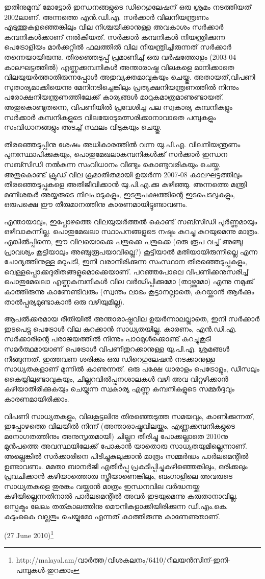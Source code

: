 ഇതിനുമുമ്പ് മോട്ടോര്‍ ഇന്ധനങ്ങളുടെ ഡിറെഗുലേഷന് ഒരു ശ്രമം നടത്തിയത് 2002ലാണ്. അന്നത്തെ 
എന്‍.ഡി.എ. സര്‍ക്കാര്‍ വിലനിയന്ത്രണം എടുത്തുകളഞ്ഞെങ്കിലും വില നിശ്ചയിക്കാനുള്ള അവകാശം സര്‍ക്കാര്‍ 
കമ്പനികള്‍ക്കാണ് നല്‍കിയത്. സര്‍ക്കാര്‍ കമ്പനികള്‍ നിയന്ത്രിക്കുന്ന പെട്രോളിയം മാര്‍ക്കറ്റില്‍ ഫലത്തില്‍ വില 
നിയന്ത്രിച്ചിരുന്നത് സര്‍ക്കാര്‍ തന്നെയായിരുന്നു. തിരഞ്ഞെടുപ്പ് പ്രമാണിച്ച് ഒരു വര്‍ഷത്തോളം (2003-04 
കാലഘട്ടത്തില്‍) എണ്ണക്കമ്പനികള്‍ അന്താരാഷ്ട്ര വിലകളെ മാനിക്കാതെ വിലയുയര്‍ത്താതിരുന്നപ്പോള്‍ 
അതുവ്യക്തമാവുകയും ചെയ്തു. അതായത്,വിപണി സുതാര്യമാക്കിയെന്നു മേനിനടിച്ചെങ്കിലും പ്രത്യക്ഷനിയന്ത്രണത്തില്‍ 
നിന്നും പരോക്ഷനിയന്ത്രണത്തിലേക്ക് കാര്യങ്ങള്‍ മാറുകമാത്രമാണുണ്ടായത്. അതുകൊണ്ടുതന്നെ, വിപണിയില്‍ 
പ്രവേശിച്ച പല സ്വകാര്യ കമ്പനികളും സര്‍ക്കാര്‍ കമ്പനികളുടെ വിലയോടുമത്സരിക്കാനാവാതെ പമ്പുകളും 
സംവിധാനങ്ങളും അടച്ച് സ്ഥലം വിടുകയും ചെയ്തു.

തിരഞ്ഞെടുപ്പിനു ശേഷം അധികാരത്തില്‍ വന്ന യു.പി.എ. വിലനിയന്ത്രണം പുനഃസ്ഥാപിക്കുകയും, 
പൊതുമേഖലാകമ്പനികള്‍ക്ക് സര്‍ക്കാര്‍ ഇന്ധന സബ്സിഡി നല്‍കുന്ന സംവിധാനം വീണ്ടും കൊണ്ടുവരികയും 
ചെയ്തു. അതുകൊണ്ട് ക്രൂഡ് വില ക്രമാതീതമായി ഉയര്‍ന്ന 2007-08 കാലഘട്ടത്തിലും തിരഞ്ഞെടുപ്പുകളെ 
അതിജീവിക്കാന്‍ യു.പി.എ.ക്കു കഴിഞ്ഞു. അന്നത്തെ മന്ത്രി മണിശങ്കര്‍ അയ്യരുടെ നിലപാടുകളും, ഇടതുപക്ഷത്തിന്റെ 
ഇടപെടലുകളും, ഒരുപക്ഷെ ഈ തീരുമാനത്തിനു കാരണമായിട്ടുണ്ടാവണം.

എന്തായാലും, ഇപ്പോഴത്തെ വിലയുയര്‍ത്തല്‍ കൊണ്ട് സബ്സിഡി പുര്‍ണ്ണമായും ഒഴിവാകുന്നില്ല. പൊതുമേഖലാ 
സ്ഥാപനങ്ങളുടെ നഷ്ടം കുറച്ചു കുറയുമെന്നു മാത്രം. എങ്കില്‍പ്പിന്നെ, ഈ വിലയൊക്കെ പതുക്കെ പതുക്കെ (ഒരു രൂപ 
വച്ച് അഞ്ചു പ്രാവശ്യം കൂട്ടിയാലും അഞ്ചുരൂപയാവില്ലെ?) കൂട്ടിയാല്‍ മതിയായിരുന്നില്ലെ എന്ന ചോദ്യത്തിനുള്ള മറുപടി, 
ഇനി വരാനിരിക്കുന്ന സംസ്ഥാന തിരഞ്ഞെടുപ്പുകളും, വെള്ളപ്പൊക്കദുരിതങ്ങളുമൊക്കെയാണ്. പറഞ്ഞപോലെ 
വിപണിക്കനുസരിച്ച് പൊതുമേഖലാ എണ്ണകമ്പനികള്‍ വില വര്‍ദ്ധിപ്പിക്കുമോ (താഴ്ത്തുമോ) എന്നു നമുക്ക് കാത്തിരുന്നു 
കാണേണ്ടിവരും (സ്വന്തം ലാഭം കൂട്ടാനല്ലാതെ, കുറയ്ക്കാന്‍ ആര്‍ക്കും താല്‍പ്പര്യമുണ്ടാകാന്‍ ഒരു വഴിയുമില്ല).

ആപല്‍ക്കരമായ രീതിയില്‍ അന്താരാഷ്ട്രവില ഉയര്‍ന്നാലല്ലാതെ, ഇനി സര്‍ക്കാര്‍ ഇടപെട്ടു പെട്രോള്‍ വില കുറക്കാന്‍
സാധ്യതയില്ല. കാരണം, എന്‍.ഡി.എ. സര്‍ക്കാരിന്റെ പരാജയത്തില്‍ നിന്നും പാഠമുള്‍ക്കൊണ്ട് കുറച്ചുകൂടി 
സമര്‍ത്ഥമായാണ് പെട്രോള്‍ വിപണിതുറക്കാനുള്ള യു.പി.എ. ശ്രമങ്ങള്‍ നീങ്ങുന്നത്. ഇത്തവണ ശരിക്കും ഒരു 
ഡിറെഗുലേഷന്‍ നടക്കാനുള്ള സാധ്യതകളാണ് മുന്നില്‍ കാണുന്നത്. ഒരു പക്ഷേ ധാരാളം പെട്രോളും, ഡീസലും 
കൈയ്യിലുണ്ടാവുകയും, ചില്ലറവില്‍പ്പനശാലകള്‍ വഴി അവ വിറ്റഴിക്കാന്‍ കഴിയാതിരിക്കുകയും ചെയ്യുന്ന സ്വകാര്യ 
എണ്ണ കമ്പനികളുടെ സമ്മര്‍ദ്ദവും കാരണമായിരിക്കാം.

വിപണി സാധ്യതകളും, വിലകൂട്ടലിനു തിരഞ്ഞെടുത്ത സമയവും, കാണിക്കുന്നത്, ഇപ്പോഴത്തെ വിലയില്‍ നിന്ന് 
(അന്താരാഷ്ട്രവിലയ്ക്കും, എണ്ണക്കമ്പനികളുടെ മനോഗതത്തിനും അനുസൃതമായി) ചില്ലറ തിരിച്ചു പോക്കല്ലാതെ 2010നു 
മുന്‍പത്തെ അവസ്ഥയിലേക്ക് പോകാന്‍ യാതൊരു സാധ്യതയുമില്ലെന്നാണ്. അല്ലെങ്കില്‍ സര്‍ക്കാരിനെ 
പിടിച്ചുകുലുക്കാന്‍ മാത്രം സമ്മര്‍ദ്ധം പാര്‍ലമെന്റില്‍ ഉണ്ടാവണം. മമതാ ബാനര്‍ജി എതിര്‍പ്പു പ്രകടിപ്പിച്ചുകഴിഞ്ഞെങ്കിലും,
ഒരിക്കലും പ്രവചിക്കാന്‍ കഴിയാത്തൊരു സ്ത്രീയാണെങ്കിലും, ബംഗാളിലെ അവരുടെ സാധ്യതകളെ തുരങ്കം വയ്ക്കാന്‍ മാത്രം
ഇന്ധനവില വര്‍ദ്ധനയ്ക്കു കഴിയില്ലെന്നതിനാല്‍ പാര്‍ലമെന്റില്‍ അവര്‍ ഇടയുമെന്നു കരുതാനാവില്ല. സ്പെക്ട്രം ലേലം
തത്കാലത്തിനു മൌനികളാക്കിയിരിക്കുന്ന ഡി.എം.കെ. കടുംകൈ വല്ലതും ചെയ്യുമോ എന്നത് കാത്തിരുന്നു 
കാണേണ്ടതാണ്.

(27 June 2010)\footnote{http://malayal.am/വാര്‍ത്ത/വിശകലനം/6410/റിലയന്‍സിന്-ഇനി-പമ്പുകള്‍-തുറക്കാം}

\newpage
